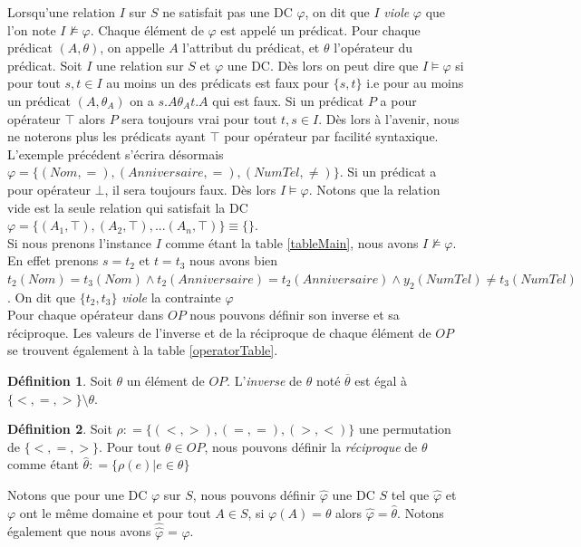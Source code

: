 \documentclass[letterpaper, 12pt]{report}
\theoremstyle{definition}
\newtheorem{mydef}{Définition}
\begin{document}
Lorsqu'une relation $I$ sur $S$ ne satisfait pas une DC $\varphi$, on dit que $I$ \emph{viole} $\varphi$ que l'on note $I \not\models \varphi$. Chaque élément de $\varphi$ est appelé un prédicat. Pour chaque prédicat $(A,\theta)$, on appelle $A$ l'attribut du prédicat, et $\theta$ l'opérateur du prédicat.  Soit $I$ une relation sur $S$ et $\varphi$ une DC. Dès lors on peut dire que $I \models \varphi$ si pour tout $s,t \in I$ au moins un des prédicats est faux pour $\{s,t\}$ i.e pour au moins un prédicat $(A,\theta_A)$ on a $s.A \theta_A t.A$ qui est faux. Si un prédicat $P$ a pour opérateur $\top$ alors $P$ sera toujours vrai pour tout $t,s \in I$. Dès lors à l'avenir, nous ne noterons plus les prédicats ayant $\top$ pour opérateur par facilité syntaxique. L'exemple précédent s'écrira désormais $\varphi =\{(Nom,=),(Anniversaire,=),(NumTel,\neq)\}$. Si un prédicat a pour opérateur $\bot$, il sera toujours faux. Dès lors $I \models \varphi$. Notons que la relation vide est la seule relation qui satisfait la DC $\varphi = \{(A_1,\top),(A_2,\top),...(A_n,\top)\} \equiv \{ \}$.\\

 Si nous prenons l'instance $I$ comme étant la table \ref{tableMain}, nous avons $I \not\models \varphi$. En effet prenons $s=t_2$ et $t=t_3$ nous avons bien $t_2(Nom) = t_3(Nom) \wedge t_2(Anniversaire) = t_2(Anniversaire) \wedge y_2(NumTel) \neq t_3(NumTel)$. On dit que $\{ t_2,t_3 \}$ \emph{viole} la contrainte $\varphi$\\ 

Pour chaque opérateur dans $OP$ nous pouvons définir son inverse et sa réciproque. Les valeurs de l'inverse et de la réciproque de chaque élément de $OP$ se trouvent également à la table \ref{operatorTable}.
\begin{mydef}
Soit $\theta$ un élément de $OP$. L'\emph{inverse} de $\theta$ noté $\overline{\theta}$ est égal à $\{<,=,>\}\setminus \theta$.

\end{mydef}

\begin{mydef}

Soit $\rho \mathrel{\mathop:}= \{ (<,>),(=,=),(>,<) \}$ une permutation de $\{<,=,> \}$. Pour tout $\theta \in OP$, nous pouvons définir la \emph{réciproque} de $\theta$ comme étant $\hat{\theta} \mathrel{\mathop:}= \{ \rho(e) | e \in \theta \}$
\end{mydef}

Notons que pour une DC $\varphi$ sur $S$, nous pouvons définir $\hat{\varphi}$ une DC $S$ tel que $\hat{\varphi}$ et $\varphi$ ont le même domaine et pour tout $A \in S$, si $\varphi(A) = \theta$ alors $\hat{\varphi} = \hat{\theta}$. Notons également que nous avons $\hat{\hat{\varphi}}$ = $\varphi$.\\
\end{document}
